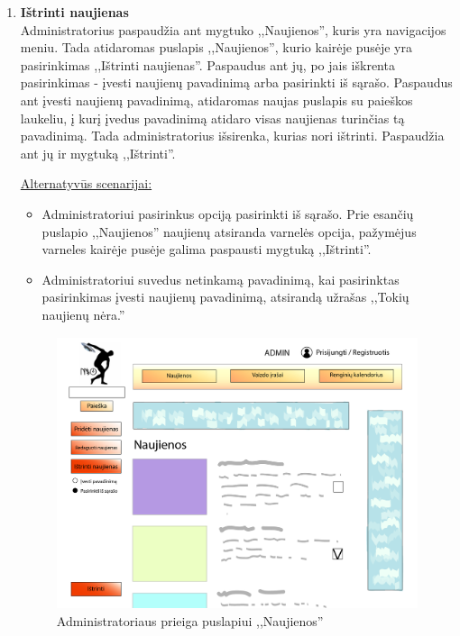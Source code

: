 \documentclass{VUMIFPSkursinis}
\begin{document}
\begin{enumerate} [label = \textbf{U\arabic*.}]
					\underline{Alternatyvūs scenarijai:}
					\begin{itemize}
						\item Administratorius paspaudęs ant naujienų pavadinimo nieko neredaguoja ir nori toliau ieškoti norimų naujienų. Tada jis spaudžia mygtuką ,,Išeiti''.
					\end{itemize}	
			
			\item \textbf{Ištrinti naujienas}   \\
					Administratorius paspaudžia ant mygtuko ,,Naujienos'', kuris yra navigacijos meniu. Tada atidaromas puslapis ,,Naujienos'', kurio kairėje pusėje yra pasirinkimas ,,Ištrinti naujienas''. Paspaudus ant jų, po jais iškrenta pasirinkimas - įvesti naujienų pavadinimą arba pasirinkti iš sąrašo. Paspaudus ant įvesti naujienų pavadinimą, atidaromas naujas puslapis su paieškos laukeliu, į kurį įvedus pavadinimą atidaro visas naujienas turinčias tą pavadinimą. Tada administratorius išsirenka, kurias nori ištrinti. Paspaudžia ant jų ir mygtuką ,,Ištrinti''.
					
					\underline{Alternatyvūs scenarijai:}
					\begin{itemize}
						\item Administratoriui pasirinkus opciją pasirinkti iš sąrašo. Prie esančių puslapio ,,Naujienos'' naujienų atsiranda varnelės opcija, pažymėjus varneles kairėje pusėje galima paspausti mygtuką ,,Ištrinti''.
						\item Administratoriui suvedus netinkamą pavadinimą, kai pasirinktas pasirinkimas įvesti naujienų pavadinimą, atsirandą užrašas ,,Tokių naujienų nėra.''
					\end{itemize}
				
				\begin{figure}[H]
					\centering
					\includegraphics[width=\textwidth, height=8cm, keepaspectratio]{img/PSI4/AdminNaujienos-01.jpg}
					\caption{Administratoriaus prieiga puslapiui ,,Naujienos''}
					\label{fig:uzd_admin_puslapisNaujienos}
				\end{figure}
				

\end{enumerate}
\end{document}
